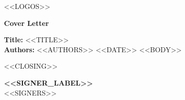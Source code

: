 \documentclass[a4paper,10pt]{article}
\begin{document}
<<LOGOS>>

\vspace{2pt}
\begin{center}{\large\bfseries Cover Letter}\end{center}
\vspace{-4pt}

\textbf{Title:} <<TITLE>>\\
\textbf{Authors:} <<AUTHORS>>
<<DATE>>
\vspace{2pt}
<<BODY>>

<<CLOSING>>

\textbf{<<SIGNER_LABEL>>}\\[2pt]
<<SIGNERS>>
\end{document}
